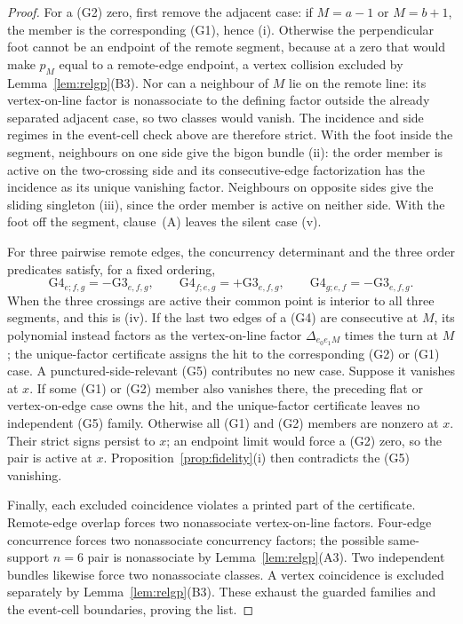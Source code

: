 \begin{proof}
For a (G2) zero, first remove the adjacent case: if $M=a-1$ or $M=b+1$, the
member is the corresponding (G1), hence (i). Otherwise the perpendicular foot
cannot be an endpoint of the remote segment, because at a zero that would make
$p_M$ equal to a remote-edge endpoint, a vertex collision excluded by
Lemma~\ref{lem:relgp}(B3). Nor can a neighbour of $M$ lie on the remote line: its
vertex-on-line factor is nonassociate to the defining factor outside the
already separated adjacent case, so two classes would vanish. The incidence
and side regimes in the event-cell check above are therefore strict. With
the foot inside the segment, neighbours on one side give the bigon bundle (ii):
the order member is active on the two-crossing side and its consecutive-edge
factorization has the incidence as its unique vanishing factor. Neighbours on
opposite sides give the sliding singleton (iii), since the order member is
active on neither side. With the foot off the segment, clause~(A)
leaves the silent case (v).

For three pairwise remote edges, the concurrency determinant and the three
order predicates satisfy, for a fixed ordering,
\[
 \mathrm{G4}_{e;f,g}=-\mathrm{G3}_{e,f,g},\qquad
 \mathrm{G4}_{f;e,g}=+\mathrm{G3}_{e,f,g},\qquad
 \mathrm{G4}_{g;e,f}=-\mathrm{G3}_{e,f,g}.
\]
When the three crossings are active their common point is interior to all three
segments, and this is (iv). If the last two edges of a (G4) are consecutive at
$M$, its polynomial instead factors as the vertex-on-line factor
$\Delta_{e_0e_1M}$ times the turn at $M$; the unique-factor certificate assigns
the hit to the corresponding (G2) or (G1) case. A punctured-side-relevant (G5) contributes no new case. Suppose it
vanishes at $x$. If some (G1) or (G2) member also vanishes there, the preceding
flat or vertex-on-edge case owns the hit, and the unique-factor certificate
leaves no independent (G5) family. Otherwise all (G1) and (G2) members are
nonzero at $x$. Their strict signs persist to $x$; an endpoint limit would force
a (G2) zero, so the pair is active at $x$. Proposition~\ref{prop:fidelity}(i)
then contradicts the (G5) vanishing.

Finally, each excluded coincidence violates a printed part of the certificate.
Remote-edge overlap forces two nonassociate vertex-on-line factors. Four-edge
concurrence forces two nonassociate concurrency factors; the possible
same-support $n=6$ pair is nonassociate by Lemma~\ref{lem:relgp}(A3).
Two independent bundles likewise force two nonassociate classes. A vertex
coincidence is excluded separately by Lemma~\ref{lem:relgp}(B3). These
exhaust the guarded families and the event-cell boundaries, proving the list.
\end{proof}

